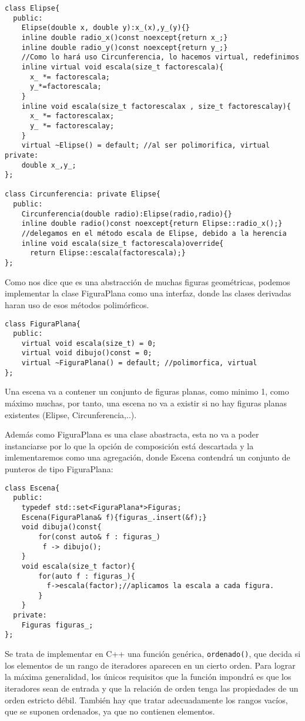 \begin{verbatim}
class Elipse{
  public:
    Elipse(double x, double y):x_(x),y_(y){}
    inline double radio_x()const noexcept{return x_;}
    inline double radio_y()const noexcept{return y_;}
    //Como lo hará uso Circunferencia, lo hacemos virtual, redefinimos
    inline virtual void escala(size_t factorescala){
	  x_ *= factorescala;
	  y_*=factorescala;
    }
    inline void escala(size_t factorescalax , size_t factorescalay){
	  x_ *= factorescalax;
	  y_ *= factorescalay;
    }
    virtual ~Elipse() = default; //al ser polimorifica, virtual
private:
    double x_,y_;
};

class Circunferencia: private Elipse{
  public:
    Circunferencia(double radio):Elipse(radio,radio){}
    inline double radio()const noexcept{return Elipse::radio_x();}
    //delegamos en el método escala de Elipse, debido a la herencia
    inline void escala(size_t factorescala)override{
      return Elipse::escala(factorescala);}
};

\end{verbatim}

Como nos dice que es una abstracción de muchas figuras geométricas, podemos implementar la clase FiguraPlana como una interfaz, donde las clases derivadas haran uso de esos métodos polimórficos.

\begin{verbatim}
class FiguraPlana{
  public:
    virtual void escala(size_t) = 0;
    virtual void dibujo()const = 0;
    virtual ~FiguraPlana() = default; //polimorfica, virtual
};
\end{verbatim}

Una escena va a contener un conjunto de figuras planas, como minimo 1, como máximo muchas, por tanto, una escena no va a existir si no hay figuras planas existentes (Elipse, Circunferencia,..).

Además como FiguraPlana es una clase abastracta, esta no va a poder instanciarse por lo que la opción de composición está descartada y la imlementaremos como una agregación, donde Escena contendrá un conjunto de punteros de tipo FiguraPlana:

\begin{verbatim}
class Escena{
  public:
    typedef std::set<FiguraPlana*>Figuras;
    Escena(FiguraPlana& f){figuras_.insert(&f);}
    void dibuja()const{
        for(const auto& f : figuras_)
         f -> dibujo();
    }
    void escala(size_t factor){
        for(auto f : figuras_){
          f->escala(factor);//aplicamos la escala a cada figura.
        }
    }
  private:
    Figuras figuras_;
};
\end{verbatim}
 Se trata de implementar en C++ una función genérica, \texttt{ordenado()}, que decida si los elementos de un rango de iteradores aparecen en un cierto orden. Para lograr la máxima generalidad, los únicos requisitos que la función impondrá es que los iteradores sean de entrada y que la relación de orden tenga las propiedades de un orden estricto débil. También hay que tratar adecuadamente los rangos vacíos, que se suponen ordenados, ya que no contienen elementos.

